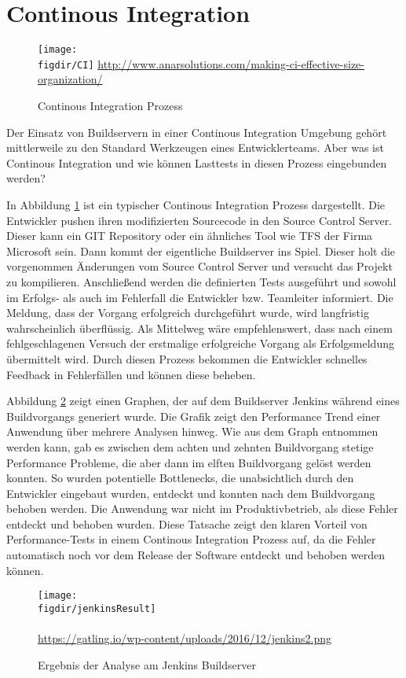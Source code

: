 \section{Continous Integration}

\begin{figure}
	{\caption{Continous Integration Prozess}
		\label{fig:continousIntegration}}
	{\texttt{[image: \\figdir/CI]}}
	\tiny{\quelle\url{http://www.anarsolutions.com/making-ci-effective-size-organization/}}
\end{figure}

Der Einsatz von Buildservern in einer Continous Integration Umgebung gehört mittlerweile zu den Standard Werkzeugen eines Entwicklerteams. 
Aber was ist Continous Integration und wie können Lasttests in diesen Prozess eingebunden werden?

In Abbildung \ref{fig:continousIntegration} ist ein typischer Continous Integration Prozess dargestellt. 
Die Entwickler pushen ihren modifizierten Sourcecode in den Source Control Server.
Dieser kann ein GIT Repository oder ein ähnliches Tool wie \ac{TFS} der Firma Microsoft sein.
Dann kommt der eigentliche Buildserver ins Spiel.
Dieser holt die vorgenommen Änderungen vom Source Control Server und versucht das Projekt zu kompilieren.
Anschließend werden die definierten Tests ausgeführt und sowohl im Erfolgs- als auch im Fehlerfall die Entwickler bzw. Teamleiter informiert.
Die Meldung, dass der Vorgang erfolgreich durchgeführt wurde, wird langfristig wahrscheinlich überflüssig.
Als Mittelweg wäre empfehlenswert, dass nach einem fehlgeschlagenen Versuch der erstmalige erfolgreiche Vorgang als Erfolgsmeldung übermittelt wird.
Durch diesen Prozess bekommen die Entwickler schnelles Feedback in Fehlerfällen und können diese beheben.

Abbildung \ref{fig:jenkinsBuildResult} zeigt einen Graphen, der auf dem Buildserver \glqq Jenkins\grqq{} während eines Buildvorgangs generiert wurde.
Die Grafik zeigt den \glqq Performance Trend\grqq{} einer Anwendung über mehrere Analysen hinweg.
Wie aus dem Graph entnommen werden kann, gab es zwischen dem achten und zehnten Buildvorgang stetige Performance Probleme, die aber dann im elften Buildvorgang gelöst werden konnten.
So wurden potentielle Bottlenecks, die unabsichtlich durch den Entwickler eingebaut wurden, entdeckt und konnten nach dem Buildvorgang behoben werden.
Die Anwendung war nicht im Produktivbetrieb, als diese Fehler entdeckt und behoben wurden.
Diese Tatsache zeigt den klaren Vorteil von Performance-Tests in einem Continous Integration Prozess auf, da die Fehler automatisch noch vor dem Release der Software entdeckt und behoben werden können.
\begin{figure}
	{\caption{Ergebnis der Analyse am Jenkins Buildserver}
		\label{fig:jenkinsBuildResult}}
	{\texttt{[image: \\figdir/jenkinsResult]}}\\~\\
				\tiny{\quelle\url{https://gatling.io/wp-content/uploads/2016/12/jenkins2.png}}
\end{figure}


